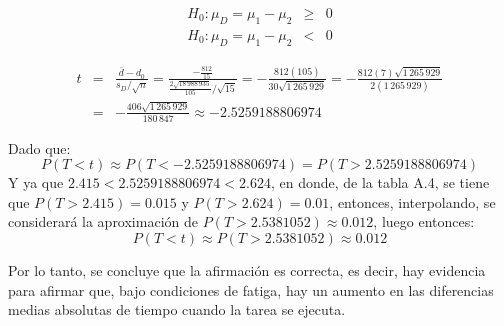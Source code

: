 \begin{solucion}
 \begin{hipotesis}
  \begin{eqnarray*}
   H_0: \mu_D = \mu_1 - \mu_2 & \geq & 0 \\
   H_0: \mu_D = \mu_1 - \mu_2 &   <  & 0
  \end{eqnarray*}
 \end{hipotesis}

 \begin{estadistico}
  \begin{eqnarray*}
   t & = & \frac{\bar{d} - d_0}{s_D/\sqrt{n}}
   = \frac{
   -\frac{812}{15}
   }{
   \frac{2\sqrt{18\,988\,935}}{105}/\sqrt{15}
   }
   = - \frac{812(105)}{30\sqrt{1\,265\,929}}
   = - \frac{812(7)\sqrt{1\,265\,929}}{2(1\,265\,929)} \\
   & = & - \frac{406\sqrt{1\,265\,929}}{180\,847}
   \approx -2.5259188806974
  \end{eqnarray*}
 \end{estadistico}

 \begin{valorp}
  Dado que:
  \begin{equation*}
   P(T<t) \approx P(T < -2.5259188806974) = P(T > 2.5259188806974)
  \end{equation*}
  Y ya que $2.415 < 2.5259188806974 < 2.624$,
  en donde, de la tabla A.4, se tiene que
  $P(T > 2.415) = 0.015$ y $P(T > 2.624) = 0.01$,
  entonces, interpolando, se considerar\'a la aproximaci\'on
  de $P(T > 2.5381052) \approx 0.012$, luego entonces:
  \begin{equation*}
   P(T<t) \approx P(T > 2.5381052) \approx 0.012
  \end{equation*}
 \end{valorp}

 \begin{conclusion}
  Por lo tanto, se concluye que la afirmaci\'on es correcta,
  es decir, hay evidencia para afirmar
  que, bajo condiciones de fatiga, hay un aumento
  en las diferencias medias absolutas de tiempo
  cuando la tarea se ejecuta.
 \end{conclusion}


\end{solucion}
